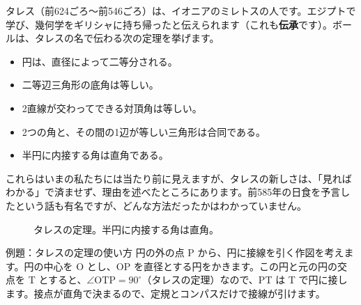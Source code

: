 \documentclass[a4paper,11pt,openany]{ltjsbook}
\begin{document}
タレス（前624ごろ〜前546ごろ）は、イオニアのミレトスの人です。エジプトで学び、幾何学をギリシャに持ち帰ったと伝えられます（これも\textbf{伝承}です）。ボールは、タレスの名で伝わる次の定理を挙げます。

\begin{itemize}[leftmargin=*]
\item 円は、直径によって二等分される。
\item 二等辺三角形の底角は等しい。
\item 2直線が交わってできる対頂角は等しい。
\item 2つの角と、その間の1辺が等しい三角形は合同である。
\item 半円に内接する角は直角である。
\end{itemize}

これらはいまの私たちには当たり前に見えますが、タレスの新しさは、「見ればわかる」で済ませず、理由を述べたところにあります。前585年の日食を予言したという話も有名ですが、どんな方法だったかはわかっていません。

\begin{figure}[htbp]
\centering
{}
\caption{タレスの定理。半円に内接する角は直角。}
\end{figure}

\begin{examplebox}{例題：タレスの定理の使い方}
円の外の点 P から、円に接線を引く作図を考えます。円の中心を O とし、OP を直径とする円をかきます。この円と元の円の交点を T とすると、$\angle \mathrm{OTP}=90^\circ$（タレスの定理）なので、PT は T で円に接します。接点が直角で決まるので、定規とコンパスだけで接線が引けます。
\end{examplebox}
\end{document}
